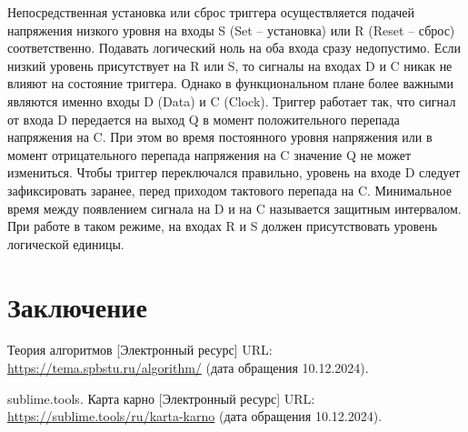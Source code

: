 \documentclass[a4paper, final]{article}
\begin{document}
Непосредственная установка или сброс триггера осуществляется подачей напряжения низкого уровня на входы S (Set -- установка) или R (Reset -- сброс) соответственно. Подавать логический ноль на оба входа сразу недопустимо. Если низкий уровень присутствует на R или S, то сигналы на входах D и C никак не влияют на состояние триггера. Однако в функциональном плане более важными являются именно входы D (Data) и C (Clock). Триггер работает так, что сигнал от входа D передается на выход Q в момент положительного перепада напряжения на C. При этом во время постоянного уровня напряжения или в момент отрицательного перепада напряжения на C значение Q не может измениться. Чтобы триггер переключался правильно, уровень на входе D следует зафиксировать заранее, перед приходом тактового перепада на C. Минимальное время между появлением сигнала на D и на C называется защитным интервалом. При работе в таком режиме, на входах R и S должен присутствовать уровень логической единицы.

\cleardoublepage
{}
\newpage
{}
\section*{Заключение}


\cleardoublepage
{}
\newpage
\begin{thebibliography}{0}
	Теория алгоритмов [Электронный ресурс] URL: \url{https://tema.spbstu.ru/algorithm/} (дата обращения 10.12.2024).

	sublime.tools. Карта карно [Электронный ресурс] URL: \url{https://sublime.tools/ru/karta-karno} (дата обращения 10.12.2024).
\end{thebibliography}
\end{document}
